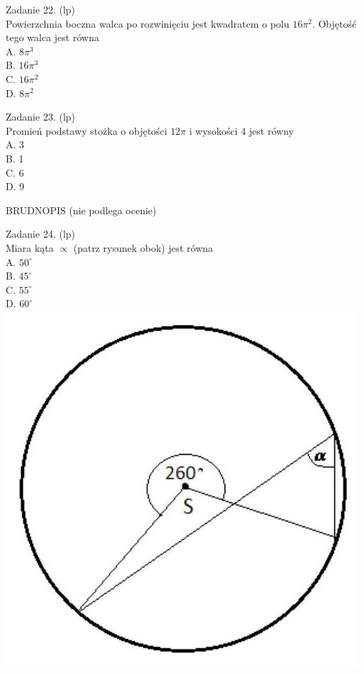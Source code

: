 \documentclass[10pt]{article}
\begin{document}
Zadanie 22. (lp)\\
Powierzchnia boczna walca po rozwinięciu jest kwadratem o polu \(16 \pi^{2}\). Objętość tego walca jest równa\\
A. \(8 \pi^{3}\)\\
B. \(16 \pi^{3}\)\\
C. \(16 \pi^{2}\)\\
D. \(8 \pi^{2}\)

Zadanie 23. (lp)\\
Promień podstawy stożka o objętości \(12 \pi\) i wysokości 4 jest równy\\
A. 3\\
B. 1\\
C. 6\\
D. 9

BRUDNOPIS (nie podlega ocenie)

Zadanie 24. (lp)\\
Miara kąta \(\propto\) (patrz rysunek obok) jest równa\\
A. \(50^{\circ}\)\\
B. \(45^{\circ}\)\\
C. \(55^{\circ}\)\\
D. \(60^{\circ}\)\\
\includegraphics[max width=\textwidth, center]{2024_11_21_92d5a9232f32cac9f1a4g-08}
\end{document}
